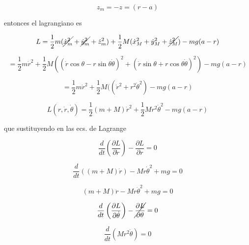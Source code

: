 \documentclass[12pt,a4paper]{article}
\begin{document}
\begin{enumerate}
\begin{enumerate}
    \begin{equation*}
        z_m =- z = (r-a) 
    \end{equation*}
    
    entonces el lagrangiano es
    
    \begin{equation*}
        L = \frac{1}{2} m (\cancel{\dot{x}_{m}^{2}} + \cancel{\dot{y}_{m}^{2}}+ \dot{z}_m^2) + \frac{1}{2} M (\dot{x}_M^2 + \dot{y}_M^2 + \cancel{\dot{z}_M^2}) - mg(a-r)
    \end{equation*}
    
    \begin{equation*}
        =\frac{1}{2} m \dot{r}^2 + \frac{1}{2} M ((\dot{r} \cos{\theta}-r\sin{\theta}\dot{\theta})^2 + (\dot{r}\sin{\theta}+r\cos{\theta}\dot{\theta})^2) - mg(a-r)
    \end{equation*}
    
    \begin{equation*}
        =\frac{1}{2} m \dot{r}^2 + \frac{1}{2} M ((\dot{r}^2 + r^2 \dot{\theta}^2) - mg(a-r)
    \end{equation*}
    
    \begin{equation*}
        L(r,\dot{r},\dot{\theta}) = \frac{1}{2}(m+M) \dot{r}^2 + \frac{1}{2}M r^2 \dot{\theta}^2 - mg (a-r)
    \end{equation*}
    
    que sustituyendo en las ecs. de Lagrange
    
    \begin{equation*}
        \frac{d}{dt}\left(\frac{\partial L}{\partial \dot{r}}\right) - \frac{\partial L}{\partial r} = 0
    \end{equation*}
    
    \begin{equation*}
        \frac{d}{dt}\left((m+M)\dot{r}\right) - Mr\dot{\theta}^2+mg = 0
    \end{equation*}
    
    \begin{equation*}
        (m+M)\ddot{r} - Mr\dot{\theta}^2+mg = 0
    \end{equation*}
    
    \begin{equation*}
        \frac{d}{dt}\left(\frac{\partial L}{\partial \dot{\theta}}\right) -\cancel{ \frac{\partial L}{\partial \theta}}= 0
    \end{equation*}
    
    \begin{equation*}
        \frac{d}{dt}\left(Mr^2\dot{\theta}\right)= 0
    \end{equation*}
    

\end{enumerate}
\end{enumerate}
\end{document}
